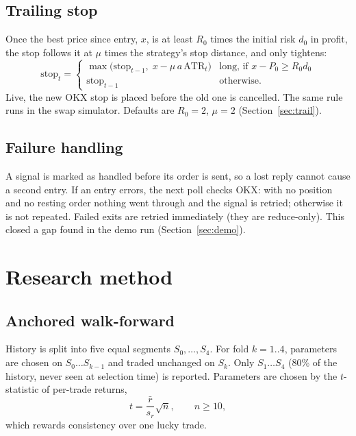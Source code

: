 \documentclass[11pt,a4paper]{article}
\begin{document}
\subsection{Trailing stop}
Once the best price since entry, $x$, is at least $R_0$ times the initial risk $d_0$ in profit,
the stop follows it at $\mu$ times the strategy's stop distance, and only tightens:
\begin{equation}
\text{stop}_t = \begin{cases}
\max\!\big(\text{stop}_{t-1},\; x - \mu\,a\,\mathrm{ATR}_t\big) & \text{long, if } x-P_0 \ge R_0 d_0\\
\text{stop}_{t-1} & \text{otherwise.}
\end{cases}
\end{equation}
Live, the new OKX stop is placed before the old one is cancelled. The same rule runs in the
swap simulator. Defaults are $R_0=2$, $\mu=2$ (Section~\ref{sec:trail}).

\subsection{Failure handling}
A signal is marked as handled before its order is sent, so a lost reply cannot cause a second
entry. If an entry errors, the next poll checks OKX: with no position and no resting order nothing
went through and the signal is retried; otherwise it is not repeated. Failed exits are retried
immediately (they are reduce-only). This closed a gap found in the demo run
(Section~\ref{sec:demo}).

\section{Research method}
\subsection{Anchored walk-forward}
History is split into five equal segments $S_0,\dots,S_4$. For fold $k=1..4$, parameters are
chosen on $S_0\ldots S_{k-1}$ and traded unchanged on $S_k$. Only $S_1\ldots S_4$ (80\% of the
history, never seen at selection time) is reported. Parameters are chosen by the $t$-statistic of
per-trade returns,
\begin{equation}
t = \frac{\bar r}{s_r}\sqrt{n}, \qquad n \ge 10,
\end{equation}
which rewards consistency over one lucky trade.
\end{document}
